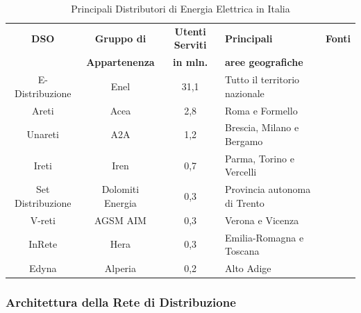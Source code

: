 \begin{table}[h!]
\renewcommand{\arraystretch}{1.5}
    \centering
    \begin{tabular}{ccclc}
        \hline
        \textbf{DSO} & \textbf{Gruppo di} & \textbf{Utenti Serviti} & \textbf{Principali} & \textbf{Fonti} \\
         & \textbf{Appartenenza} & \textbf{in mln.} & \textbf{aree geografiche} & \\
        \hline
        E-Distribuzione & Enel & 31,1 & Tutto il territorio nazionale & \cite{Clienti-sertivi-distribuzione} \\
        Areti & Acea & 2,8 & Roma e Formello & \cite{Clienti-sertivi-areti} \\
        Unareti & A2A & 1,2 & Brescia, Milano e Bergamo & \cite{Clienti-sertivi-uniareti} \\
        Ireti & Iren & 0,7 & Parma, Torino e Vercelli & \cite{Clienti-sertivi-ireti} \\
        Set Distribuzione & Dolomiti Energia & 0,3 & Provincia autonoma di Trento & \cite{Clienti-sertivi-SetDistribuzione} \\
        V-reti & AGSM AIM & 0,3 & Verona e Vicenza & \cite{Clienti-sertivi-v-reti} \\
        InRete & Hera & 0,3 & Emilia-Romagna e Toscana & \cite{Clienti-sertivi-InRete} \\
        Edyna & Alperia & 0,2 & Alto Adige & \cite{Clienti-sertivi-edyna} \\
        \hline
    \end{tabular}
    \caption{Principali Distributori di Energia Elettrica in Italia}
    \label{tab:dso_italia}
\end{table}




\subsubsection{Architettura della Rete di Distribuzione}


